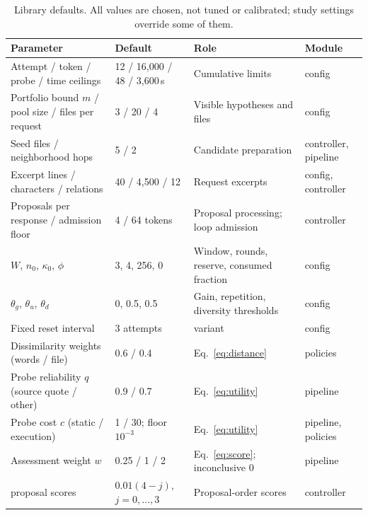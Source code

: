 \documentclass[a4paper,fleqn]{cas-sc}
\newcommand{\code}[1]{\texttt{\detokenize{#1}}}
\begin{document}
\begin{table}[width=\FullWidth,pos=!htbp]
\caption{Library defaults. All values are chosen, not tuned or calibrated; study settings override some of them.}\label{tab:defaults}
\centering\small
\begin{tabular}{@{}p{}p{}p{}p{}@{}}\toprule
Parameter & Default & Role & Module\\\midrule
Attempt / token / probe / time ceilings & 12 / 16,000 / 48 / 3,600\,s & Cumulative limits & config\\
Portfolio bound $m$ / pool size / files per request & 3 / 20 / 4 & Visible hypotheses and files & config\\
Seed files / neighborhood hops & 5 / 2 & Candidate preparation & controller, pipeline\\
Excerpt lines / characters / relations & 40 / 4,500 / 12 & Request excerpts & config, controller\\
Proposals per response / admission floor & 4 / 64 tokens & Proposal processing; loop admission & controller\\
$W$, $n_0$, $\kappa_0$, $\phi$ & 3, 4, 256, 0 & Window, rounds, reserve, consumed fraction & config\\
$\theta_g$, $\theta_u$, $\theta_d$ & 0, 0.5, 0.5 & Gain, repetition, diversity thresholds & config\\
Fixed reset interval & 3 attempts & \code{fixed_reset} variant & config\\
Dissimilarity weights (words / file) & 0.6 / 0.4 & Eq.~\eqref{eq:distance} & policies\\
Probe reliability $q$ (source quote / other) & 0.9 / 0.7 & Eq.~\eqref{eq:utility} & pipeline\\
Probe cost $c$ (static / execution) & 1 / 30; floor $10^{-3}$ & Eq.~\eqref{eq:utility} & pipeline, policies\\
Assessment weight $w$ & 0.25 / 1 / 2 & Eq.~\eqref{eq:score}; inconclusive 0 & pipeline\\
\code{no_probes} proposal scores & $0.01(4-j)$, $j=0,\ldots,3$ & Proposal-order scores & controller\\
\bottomrule\end{tabular}
\end{table}
\end{document}
